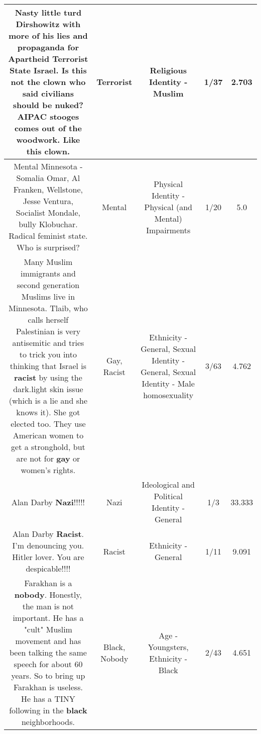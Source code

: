 \documentclass[11pt]{article}
\newlength\mylength
\begin{document}
\begin{center}
\begin{longtable}{|C{.65\mylength}|C{.30\mylength}|C{.12\mylength}|C{.12\mylength}|C{.12\mylength}|}
  \small Nasty little turd Dirshowitz with more of his lies and propaganda for Apartheid \textbf{Terrorist} State Israel. Is this not the clown who said civilians should be nuked? AIPAC stooges comes out of the woodwork. Like this clown.\normalsize   & Terrorist & Religious Identity - Muslim & 1/37 & 2.703 \\  \hline
  \small Mental Minnesota - Somalia Omar,  Al Franken, Wellstone, Jesse Ventura, Socialist Mondale, bully Klobuchar. Radical feminist state. Who is surprised?\normalsize   & Mental & Physical Identity - Physical (and Mental) Impairments & 1/20 & 5.0 \\  \hline
  \small Many Muslim immigrants and second generation Muslims live in Minnesota.  Tlaib, who calls herself Palestinian is very antisemitic and tries to trick you into thinking that Israel is \textbf{racist} by using the dark.light skin issue (which is a lie and she knows it).   She got elected too.  They use American women to get a stronghold, but are not for \textbf{g\textbf{ay}} or women's rights.\normalsize   & Gay, Racist & Ethnicity - General, Sexual Identity - General, Sexual Identity - Male homosexuality & 3/63 & 4.762 \\  \hline
  \small Alan Darby   \textbf{Nazi}!!!!!\normalsize   & Nazi &  Ideological and Political Identity - General & 1/3 & 33.333 \\  \hline
  \small Alan Darby   \textbf{Racist}. I'm denouncing you. Hitler lover. You are despicable!!!!\normalsize   & Racist & Ethnicity - General & 1/11 & 9.091 \\  \hline
  \small Farakhan is a \textbf{nobody}.  Honestly, the man is not important.  He has a "cult" Muslim movement and has been talking the same speech for about 60 years.  So to bring up Farakhan is useless.  He has a TINY following in the \textbf{black} neighborhoods.\normalsize   & Black, Nobody & Age - Youngsters, Ethnicity - Black & 2/43 & 4.651 \\  \hline

\end{longtable}
\end{center}
\end{document}
